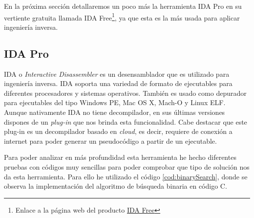 En la próxima sección detallaremos un poco más la herramienta IDA Pro en su vertiente
gratuita llamada IDA Free\footnote{Enlace a la página web del producto \href{https://hex-rays.com/ida-free/}{IDA Free}},
ya que esta es la más usada para aplicar ingeniería inversa.

\subsection{IDA Pro}
\label{subsec:IDA_pro}


IDA o \textit{Interactive Disassembler} es un desensamblador que es utilizado para
ingeniería inversa. IDA soporta una variedad de formato de ejecutables para diferentes
procesadores y sistemas operativos. También es usado como depurador para ejecutables
del tipo Windows PE, Mac OS X, Mach-O y Linux ELF\cite{IDAPro_Wikipedia}. Aunque
nativamente IDA no tiene decompilador, en sus últimas versiones dispones de un \textit{plug-in}
que nos brinda esta funcionalidad. Cabe destacar que este plug-in es un decompilador
basado en \textit{cloud}, es decir, requiere de conexión a internet para poder generar
un pseudocódigo a partir de un ejecutable.

Para poder analizar en más profundidad esta herramienta he hecho diferentes pruebas
con códigos muy sencillas para poder comprobar que tipo de solución nos da esta
herramienta. Para ello he utilizado el código \ref{cod:binarySearch}, donde se observa
la implementación del algoritmo de búsqueda binaria en código C.

